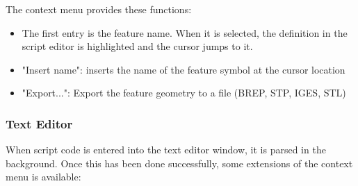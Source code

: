 The context menu provides these functions:

\begin{itemize}
\item The first entry is the feature name. When it is selected, the
    definition in the script editor is highlighted and the cursor jumps
    to it.
\item "Insert name": inserts the name of the feature symbol at the cursor
    location
\item "Export...": Export the feature geometry to a file (BREP, STP, IGES, STL)
\end{itemize}


\subsubsection{Text Editor}

When script code is entered into the text editor window, it is parsed in
the background. Once this has been done successfully, some extensions of
the context menu is available:

